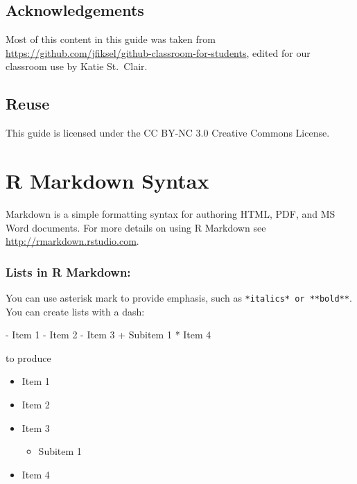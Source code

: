 \documentclass[
]{book}
\newenvironment{Shaded}{\begin{snugshade}}{\end{snugshade}}
\newcommand{\DecValTok}[1]{\textcolor[rgb]{0.00,0.00,0.81}{#1}}
\newcommand{\NormalTok}[1]{#1}
\newcommand{\SpecialCharTok}[1]{\textcolor[rgb]{0.00,0.00,0.00}{#1}}
\providecommand{\tightlist}{%
  \setlength{\itemsep}{0pt}\setlength{\parskip}{0pt}}
\begin{document}
\hypertarget{acknowledgements-1}{%
\section{Acknowledgements}\label{acknowledgements-1}}

Most of this content in this guide was taken from
\url{https://github.com/jfiksel/github-classroom-for-students}, edited for our classroom use by Katie St.~Clair.

\hypertarget{reuse}{%
\section{Reuse}\label{reuse}}

This guide is licensed under the CC BY-NC 3.0 Creative
Commons License.

\hypertarget{r-markdown-syntax}{%
\chapter{R Markdown Syntax}\label{r-markdown-syntax}}

Markdown is a simple formatting syntax for authoring HTML, PDF, and MS Word documents. For more details on using R Markdown see \url{http://rmarkdown.rstudio.com}.

\hypertarget{lists-in-r-markdown}{%
\subsection{Lists in R Markdown:}\label{lists-in-r-markdown}}

You can use asterisk mark to provide emphasis, such as \texttt{*italics*\ or\ **bold**}. You can create lists with a dash:

\begin{Shaded}
\begin{Highlighting}[]
\SpecialCharTok{{-}}\NormalTok{ Item }\DecValTok{1}
\SpecialCharTok{{-}}\NormalTok{ Item }\DecValTok{2}
\SpecialCharTok{{-}}\NormalTok{ Item }\DecValTok{3}
  \SpecialCharTok{+}\NormalTok{ Subitem }\DecValTok{1}
\SpecialCharTok{*}\NormalTok{ Item }\DecValTok{4}
\end{Highlighting}
\end{Shaded}

to produce

\begin{itemize}
\tightlist
\item
  Item 1
\item
  Item 2
\item
  Item 3

  \begin{itemize}
  \tightlist
  \item
    Subitem 1
  \end{itemize}
\item
  Item 4
\end{itemize}
\end{document}
